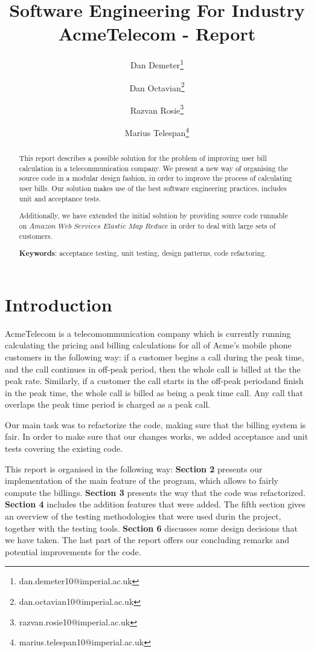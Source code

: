 \documentclass[11pt,twocolumn]{article} %
\title{Software Engineering For Industry \\ AcmeTelecom - Report}
\author[1]{Dan Demeter\thanks{dan.demeter10@imperial.ac.uk}}
\author[1]{Dan Octavian\thanks{dan.octavian10@imperial.ac.uk}}
\author[1]{Razvan Rosie\thanks{razvan.rosie10@imperial.ac.uk}}
\author[1]{Marius Telespan\thanks{marius.telespan10@imperial.ac.uk}}
\affil[1]{Department of Computing, Imperial College London}
\begin{document}
\maketitle

\begin{abstract}
This report describes a possible solution for the problem of improving user bill calculation in a telecommunication company. 
We present a new way of organising the source code in a modular design fashion, in order to improve the process of calculating user bills. Our solution makes use of the best software engineering practices, includes unit and acceptance tests.

Additionally, we have extended the initial solution by providing source code runnable on $Amazon$ $Web$ $Services$ $Elastic$ $Map$ $Reduce$ in order to deal with large sets of customers.
\newline

{\bf Keywords}: acceptance testing, unit testing, design patterns, code refactoring.
\end{abstract}


\section{Introduction}
AcmeTelecom is a telecomommunication company which is currently running calculating the pricing and billing calculations
for all of Acme's mobile phone customers in the following way: if a customer begins a call during the peak time, and the call 
continues in off-peak period, then the whole call is billed at the the peak rate. Similarly, if a customer the call starts in 
the off-peak periodand finish in the peak time, the whole call is billed as being a peak time call. Any call that overlaps the 
peak time period is charged as a peak call.


Our main task was to refactorize the code, making sure that the billing system is fair. In order to make sure that our changes works,
we added acceptance and unit tests covering the existing code.

This report is organised in the following way: {\bf Section 2} presents our implementation of the main feature of the program, which
allows to fairly compute the billings. {\bf Section 3} presents the way that the code was refactorized. 
{\bf Section 4} includes the addition features that were added. 
The fifth section gives an overview of the testing methodologies that were used durin the project, together with the testing tools.
{\bf Section 6} discusses some design decisions that we have taken.
The last part of the report offers our concluding remarks and potential improvements for the code.
\end{document}

